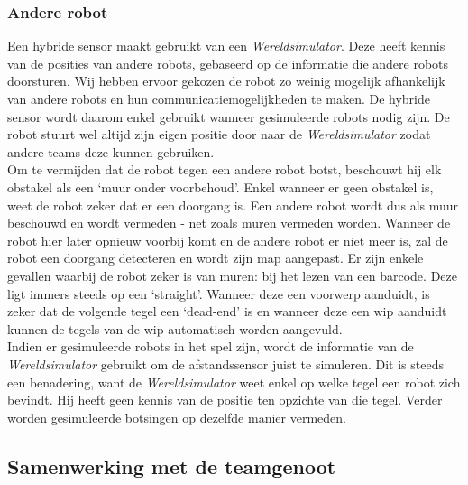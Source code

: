 \documentclass[eind]{penoverslag}
\begin{document}
\subsubsection{Andere robot}
\label{sssec:AlgoCollision}
Een hybride sensor maakt gebruikt van een \textit{Wereldsimulator}. Deze heeft kennis van de posities van andere robots, gebaseerd op de informatie die andere robots doorsturen. Wij hebben ervoor gekozen de robot zo weinig mogelijk afhankelijk van andere robots en hun communicatiemogelijkheden te maken. De hybride sensor wordt daarom enkel gebruikt wanneer gesimuleerde robots nodig zijn. De robot stuurt wel altijd zijn eigen positie door naar de \textit{Wereldsimulator} zodat andere teams deze kunnen gebruiken.\\

Om te vermijden dat de robot tegen een andere robot botst, beschouwt hij elk obstakel als een `muur onder voorbehoud'. Enkel wanneer er geen obstakel is, weet de robot zeker dat er een doorgang is. Een andere robot wordt dus als muur beschouwd en wordt vermeden - net zoals muren vermeden worden. Wanneer de robot hier later opnieuw voorbij komt en de andere robot er niet meer is, zal de robot een doorgang detecteren en wordt zijn map aangepast. Er zijn enkele gevallen waarbij de robot zeker is van muren: bij het lezen van een barcode. Deze ligt immers steeds op een `straight'. Wanneer deze een voorwerp aanduidt, is zeker dat de volgende tegel een `dead-end' is en wanneer deze een wip aanduidt kunnen de tegels van de wip automatisch worden aangevuld. \\

Indien er gesimuleerde robots in het spel zijn, wordt de informatie van de \textit{Wereldsimulator} gebruikt om de afstandssensor juist te simuleren. Dit is steeds een benadering, want de \textit{Wereldsimulator} weet enkel op welke tegel een robot zich bevindt. Hij heeft geen kennis van de positie ten opzichte van die tegel. Verder worden gesimuleerde botsingen op dezelfde manier vermeden.\\

\subsection{Samenwerking met de teamgenoot}
\label{ssec:AlgoSamen}

\end{document}
